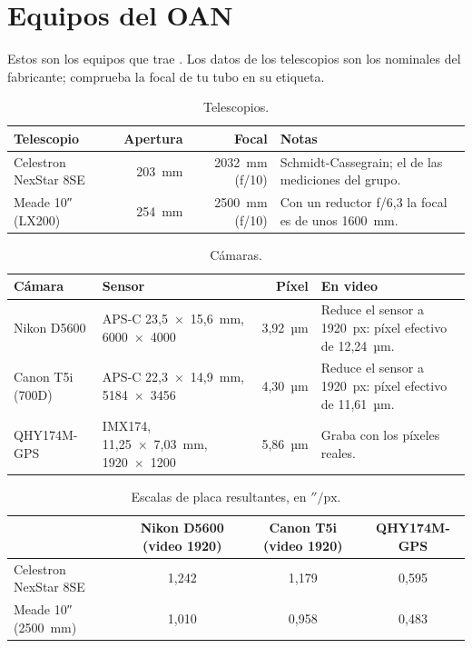\chapter{Equipos del OAN}\label{ap:oan}

Estos son los equipos que trae . Los datos de los telescopios son los nominales del fabricante;
comprueba la focal de tu tubo en su etiqueta.

\begin{table}[H]
\centering\small
\begin{tabularx}{\linewidth}{@{}l r r Y@{}}
\toprule
Telescopio & Apertura & Focal & Notas\\
\midrule
Celestron NexStar 8SE & 203~mm & 2032~mm (f/10) & Schmidt-Cassegrain; el de las mediciones del grupo.\\
Meade 10″ (LX200) & 254~mm & 2500~mm (f/10) & Con un reductor f/6,3 la focal es de unos 1600~mm.\\
\bottomrule
\end{tabularx}
\caption{Telescopios.}
\end{table}

\begin{table}[H]
\centering\small
\begin{tabularx}{\linewidth}{@{}l l r Y@{}}
\toprule
Cámara & Sensor & Píxel & En video\\
\midrule
Nikon D5600 & APS-C 23,5~×~15,6~mm, 6000~×~4000 & 3,92~µm & Reduce el sensor a 1920~px: píxel efectivo de 12,24~µm.\\
Canon T5i (700D) & APS-C 22,3~×~14,9~mm, 5184~×~3456 & 4,30~µm & Reduce el sensor a 1920~px: píxel efectivo de 11,61~µm.\\
QHY174M-GPS & IMX174, 11,25~×~7,03~mm, 1920~×~1200 & 5,86~µm & Graba con los píxeles reales.\\
\bottomrule
\end{tabularx}
\caption{Cámaras.}
\end{table}

\begin{table}[H]
\centering\small
\begin{tabular}{@{}l c c c@{}}
\toprule
 & Nikon D5600 (video 1920) & Canon T5i (video 1920) & QHY174M-GPS\\
\midrule
Celestron NexStar 8SE & 1,242 & 1,179 & 0,595\\
Meade 10″ (2500~mm) & 1,010 & 0,958 & 0,483\\
\bottomrule
\end{tabular}
\caption{Escalas de placa resultantes, en $''/\text{px}$.}
\end{table}

